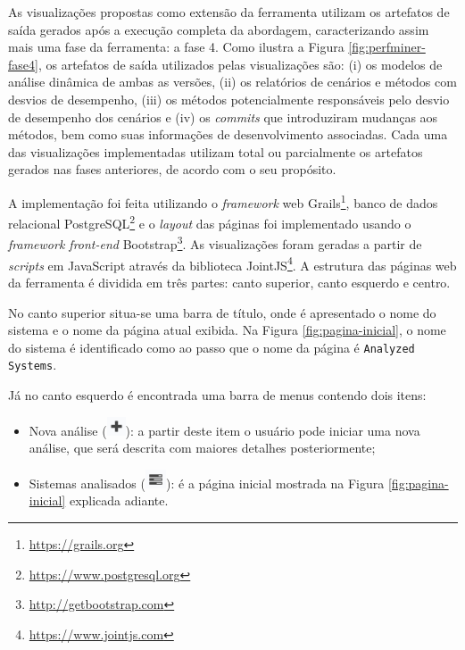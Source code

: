 As visualizações propostas como extensão da ferramenta utilizam os artefatos de saída gerados após a execução completa da abordagem, caracterizando assim mais uma fase da ferramenta: a fase 4. Como ilustra a Figura \ref{fig:perfminer-fase4}, os artefatos de saída utilizados pelas visualizações são: (i) os modelos de análise dinâmica de ambas as versões, (ii) os relatórios de cenários e métodos com desvios de desempenho, (iii) os métodos potencialmente responsáveis pelo desvio de desempenho dos cenários e (iv) os \textit{commits} que introduziram mudanças aos métodos, bem como suas informações de desenvolvimento associadas. Cada uma das visualizações implementadas utilizam total ou parcialmente os artefatos gerados nas fases anteriores, de acordo com o seu propósito.

A implementação foi feita utilizando o \textit{framework} web Grails\footnote{\href{https://grails.org}{https://grails.org}}, banco de dados relacional PostgreSQL\footnote{\href{https://www.postgresql.org}{https://www.postgresql.org}} e o \textit{layout} das páginas foi implementado usando o \textit{framework front-end} Bootstrap\footnote{\href{http://getbootstrap.com}{http://getbootstrap.com}}. As visualizações foram geradas a partir de \textit{scripts} em JavaScript através da biblioteca JointJS\footnote{\href{https://www.jointjs.com}{https://www.jointjs.com}}. A estrutura das páginas web da ferramenta é dividida em três partes: canto superior, canto esquerdo e centro.

No canto superior situa-se uma barra de título, onde é apresentado o nome do sistema e o nome da página atual exibida. Na Figura \ref{fig:pagina-inicial}, o nome do sistema é identificado como \texttt{\toolName} ao passo que o nome da página é \texttt{Analyzed Systems}.

Já no canto esquerdo é encontrada uma barra de menus contendo dois itens:
\begin{itemize}
   \item Nova análise (\includegraphics[height=1.5em,valign=b]{Imagens/icon_new_analysis.png}): a partir deste item o usuário pode iniciar uma nova análise, que será descrita com maiores detalhes posteriormente;
   \item Sistemas analisados (\includegraphics[height=1.5em,valign=b]{Imagens/icon_analyzed_systems.png}): é a página inicial mostrada na Figura \ref{fig:pagina-inicial} explicada adiante.
\end{itemize}

